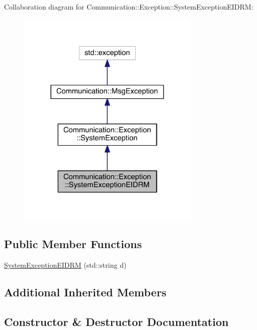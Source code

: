 Collaboration diagram for Communication\+:\+:Exception\+:\+:System\+Exception\+E\+I\+D\+R\+M\+:\nopagebreak
\begin{figure}[H]
\begin{center}
\leavevmode
\includegraphics[width=248pt]{class_communication_1_1_exception_1_1_system_exception_e_i_d_r_m__coll__graph}
\end{center}
\end{figure}
\subsection*{Public Member Functions}
\begin{DoxyCompactItemize}
\item 
\hyperlink{class_communication_1_1_exception_1_1_system_exception_e_i_d_r_m_aa2efb5a143581c1aab91ceb830ab67aa}{System\+Exception\+E\+I\+D\+R\+M} (std\+::string d)
\end{DoxyCompactItemize}
\subsection*{Additional Inherited Members}


\subsection{Constructor \& Destructor Documentation}
\hypertarget{class_communication_1_1_exception_1_1_system_exception_e_i_d_r_m_aa2efb5a143581c1aab91ceb830ab67aa}{}
